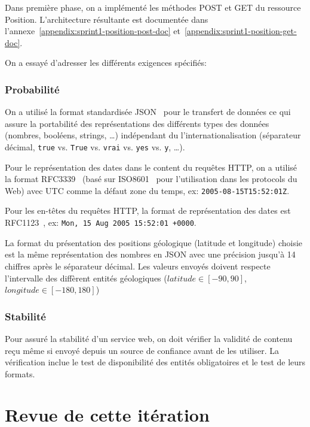 Dans première phase, on a implémenté les méthodes POST et GET du ressource
Position. L'architecture résultante est documentée dans
l'annexe~\ref{appendix:sprint1-position-post-doc}
et~\ref{appendix:sprint1-position-get-doc}.

On a essayé d'adresser les différents exigences spécifiés:

\subsubsection{Probabilité}

On a utilisé la format standardisée JSON~\cite{ECMA-404} pour le transfert de
données ce qui assure la portabilité des représentations des différents types
des données (nombres, booléens, strings, \ldots) indépendant du
l'internationalisation (séparateur décimal, \verb|true| vs. \verb|True| vs.
\verb|vrai| vs. \verb|yes| vs. \verb|y|, \ldots).

Pour le représentation des dates dans le content du requêtes HTTP, on a utilisé
la format RFC3339~\cite{RFC3339} (basé sur ISO8601~\cite{ISO8601} pour
l'utilisation dans les protocols du Web) avec UTC comme la défaut zone du
temps, ex: \verb|2005-08-15T15:52:01Z|.

Pour les en-têtes du requêtes HTTP, la format de représentation des dates est
RFC1123~\cite{RFC1123}, ex: \verb|Mon, 15 Aug 2005 15:52:01 +0000|.

La format du présentation des positions géologique (latitude et longitude)
choisie est la même représentation des nombres en JSON avec une précision
jusqu'à 14 chiffres après le séparateur décimal. Les valeurs envoyés doivent
respecte l'intervalle des diffèrent entités géologiques ($latitude \in [-90,
90]$, $longitude \in [-180, 180]$)

\subsubsection{Stabilité}

Pour assuré la stabilité d'un service web, on doit vérifier la validité de
contenu reçu même si envoyé depuis un source de confiance avant de les
utiliser. La vérification inclue le test de disponibilité des entités
obligatoires et le test de leurs formats.

\section{Revue de cette itération}


